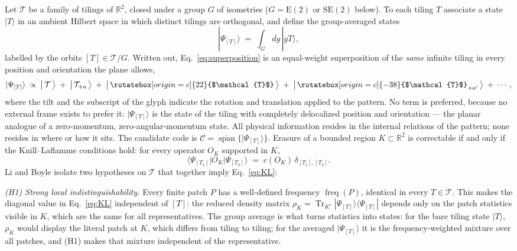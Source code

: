 \documentclass[a4paper,unpublished]{quantumarticle}
\theoremstyle{remark}
\newcommand{\RR}{\mathbb{R}}
\newcommand{\Etwo}{\mathrm{E}(2)}
\newcommand{\SEtwo}{\mathrm{SE}(2)}
\newcommand{\freq}{\operatorname{freq}}
\newcommand{\rhoK}{\rho_{K}}
\begin{document}
Let $\mathcal{T}$ be a family of tilings of $\RR^{2}$, closed under a
group $G$ of isometries ($G = \Etwo$ or $\SEtwo$ below). To each
tiling $T$ associate a state $|T\rangle$ in an ambient Hilbert space
in which distinct tilings are orthogonal, and define the
group-averaged states
\begin{equation}
|\Psi_{[T]}\rangle \;=\; \int_{G} dg\, |gT\rangle ,
\label{eq:superposition}
\end{equation}
labelled by the orbits $[T] \in \mathcal{T}/G$. Written out,
Eq.~\eqref{eq:superposition} is an equal-weight superposition of the
\emph{same} infinite tiling in every position and orientation the
plane allows,
\begin{equation}
|\Psi_{[T]}\rangle \;\propto\;
\bigl|\, \mathcal{T} \,\bigr\rangle
\;+\; \bigl|\, \mathcal{T}_{+a} \,\bigr\rangle
\;+\; \bigl|\, \rotatebox[origin=c]{22}{$\mathcal{T}$} \,\bigr\rangle
\;+\; \bigl|\, {\rotatebox[origin=c]{-38}{$\mathcal{T}$}}_{+a'}
\,\bigr\rangle \;+\; \cdots ,
\label{eq:ketsum}
\end{equation}
where the tilt and the subscript of the glyph indicate the rotation
and translation applied to the pattern. No term is preferred, because
no external frame exists to prefer it: $|\Psi_{[T]}\rangle$ is the
state of the tiling with completely delocalized position and
orientation --- the planar analogue of a zero-momentum,
zero-angular-momentum state. All physical information resides in the
internal relations of the pattern; none resides in where or how it
sits. The candidate code is
$\mathcal{C} = \overline{\operatorname{span}}
\{ |\Psi_{[T]}\rangle \}$. Erasure of a bounded region
$K \subset \RR^{2}$ is correctable if and only if the Knill--Laflamme
conditions hold: for every operator $O_{K}$ supported in $K$,
\begin{equation}
\langle \Psi_{[T_{1}]} | O_{K} | \Psi_{[T_{2}]} \rangle
\;=\; c(O_{K})\, \delta_{[T_{1}],[T_{2}]} .
\label{eq:KL}
\end{equation}
Li and Boyle \cite{LiBoyle2024} isolate two hypotheses on
$\mathcal{T}$ that together imply Eq.~\eqref{eq:KL}:

\emph{(H1) Strong local indistinguishability.} Every finite patch $P$
has a well-defined frequency $\freq(P)$, identical in every
$T \in \mathcal{T}$. This makes the diagonal value in
Eq.~\eqref{eq:KL} independent of $[T]$: the reduced density matrix
$\rhoK = \operatorname{Tr}_{K^{c}} |\Psi_{[T]}\rangle\langle
\Psi_{[T]}|$ depends only on the patch statistics visible in $K$,
which are the same for all representatives. The group average is what
turns statistics into states: for the bare tiling state $|T\rangle$,
$\rhoK$ would display the literal patch at $K$, which differs from
tiling to tiling; for the averaged $|\Psi_{[T]}\rangle$ it is the
frequency-weighted mixture over all patches, and (H1) makes that
mixture independent of the representative.
\end{document}
